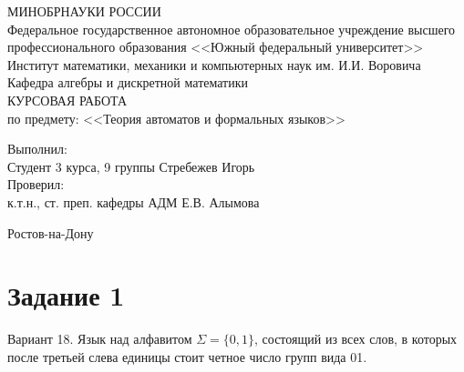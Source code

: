 \documentclass[fleqn,12pt, a4paper]{article}
\begin{document}

\begin{titlepage}

\begin{center} 
\MakeUppercase{Минобрнауки России}\\
Федеральное государственное автономное образовательное учреждение
высшего профессионального образования
<<Южный федеральный университет>>\\[1 cm]

Институт математики, механики и компьютерных наук им. И.И. Воровича\\[1 cm]

Кафедра алгебры и дискретной математики\\[5cm]

\Huge \MakeUppercase{Курсовая работа} \\[0.6cm]

\large по предмету: <<Теория автоматов и формальных языков>>\\[7cm]

\end{center}

\begin{flushleft}
{\large 
Выполнил: \\
Студент 3 курса, 9 группы \hfill Стребежев Игорь \\[1cm]

Проверил:\\
к.т.н., ст. преп. кафедры АДМ \hfill Е.В. Алымова}

\end{flushleft}
\vfill

\begin{center}
Ростов-на-Дону\\
\the\year
\end{center}
\end{titlepage}


\section*{Задание 1}

Вариант 18. Язык над алфавитом $\Sigma = \{ 0, 1 \} $, состоящий из всех слов, в которых после третьей слева единицы стоит четное число групп вида 01.
\end{document}
